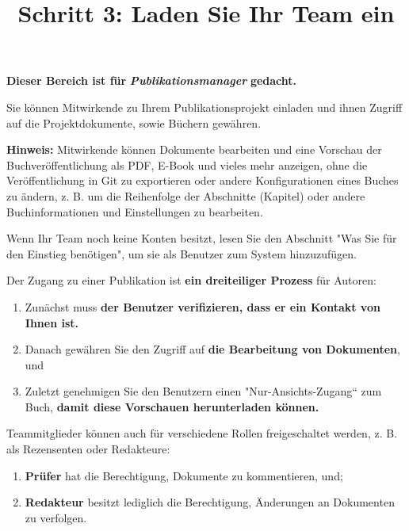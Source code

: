 \documentclass{article}
\begin{document}
\title{Schritt 3: Laden Sie Ihr Team ein}

\maketitle


\textbf{Dieser Bereich ist für }\emph{\textbf{Publikationsmanager}}\textbf{ gedacht.}


Sie können Mitwirkende zu Ihrem Publikationsprojekt einladen und ihnen Zugriff auf die Projektdokumente, sowie Büchern gewähren.


\textbf{Hinweis:} Mitwirkende können Dokumente bearbeiten und eine Vorschau der Buchveröffentlichung als PDF, E-Book und vieles mehr anzeigen, ohne die Veröffentlichung in Git zu exportieren oder andere Konfigurationen eines Buches zu ändern, z. B. um die Reihenfolge der Abschnitte (Kapitel) oder andere Buchinformationen und Einstellungen zu bearbeiten.


Wenn Ihr Team noch keine Konten besitzt, lesen Sie den Abschnitt "Was Sie für den Einstieg benötigen", um sie als Benutzer zum System hinzuzufügen.


Der Zugang zu einer Publikation ist \textbf{ein dreiteiliger Prozess} für Autoren:

\begin{enumerate}
\item Zunächst muss \textbf{der Benutzer verifizieren, dass er ein Kontakt von Ihnen ist.}


\item Danach gewähren Sie den Zugriff auf \textbf{die Bearbeitung von Dokumenten}, und


\item Zuletzt genehmigen Sie den Benutzern einen "Nur-Ansichts-Zugang“ zum Buch, \textbf{damit diese Vorschauen herunterladen können.}


\end{enumerate}

Teammitglieder können auch für verschiedene Rollen freigeschaltet werden, z. B. als Rezensenten oder Redakteure:

\begin{enumerate}
\item \textbf{Prüfer} hat die Berechtigung, Dokumente zu kommentieren, und;


\item \textbf{Redakteur} besitzt lediglich die Berechtigung, Änderungen an Dokumenten zu verfolgen.


\end{enumerate}
\end{document}
